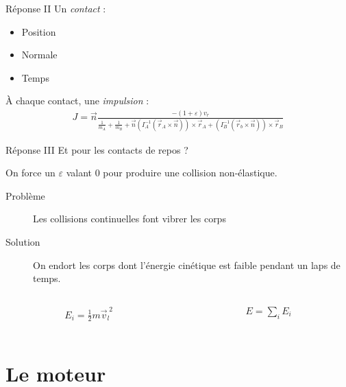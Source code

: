 \documentclass{beamer}
\begin{document}
\begin{frame}{Réponse II}
  Un \textit{contact} :
  \begin{itemize}
  \item Position
  \item Normale
  \item Temps
  \end{itemize}

  \vfill

  \`A chaque contact, une \textit{impulsion} :
  \begin{align*}
    J = \vec{n} 
    \frac{-(1 + \varepsilon) v_r}{
      \frac{1}{m_A} +
      \frac{1}{m_B} +
      \vec{n}
      (I_A^{-1} (\vec{r}_A \times \vec{n})) \times \vec{r}_A +
      (I_B^{-1} (\vec{r}_b \times \vec{n})) \times \vec{r}_B
    }
  \end{align*}
\end{frame}

\begin{frame}{Réponse III}
  Et pour les contacts de repos ?

  \vfill

  On force un $\varepsilon$ valant 0 pour produire une collision non-élastique.

  \vfill

  \begin{description}
    \item[Problème] Les collisions continuelles font vibrer les corps
    \item[Solution] On endort les corps dont l'énergie cinétique est faible pendant un laps de temps.
  \end{description}
  
  \vfill

  \begin{columns}
    \begin{column}{3cm}
      \begin{align*}
        E_i = \frac{1}{2} m \vec{v}^{\;2}_l
      \end{align*}
    \end{column}
    \begin{column}{3cm}
      \begin{align*}
        E = \sum_i E_i
      \end{align*}
    \end{column}
  \end{columns}
\end{frame}
\section{Le moteur}
\end{document}
